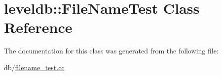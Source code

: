 \hypertarget{classleveldb_1_1_file_name_test}{\section{leveldb\-:\-:File\-Name\-Test Class Reference}
\label{classleveldb_1_1_file_name_test}
}


The documentation for this class was generated from the following file\-:\begin{DoxyCompactItemize}
\item 
db/\hyperlink{filename__test_8cc}{filename\-\_\-test.\-cc}\end{DoxyCompactItemize}
